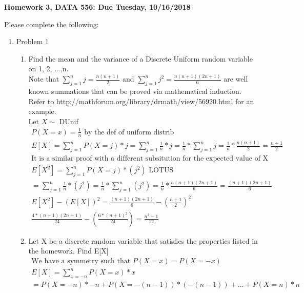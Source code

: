 \documentclass[11pt]{article}
\begin{document}
\begin{title}
	{\Large\bf Homework 3, DATA 556: Due Tuesday, 10/16/2018}
\end{title}

\author{\bf Alexander Van Roijen}

\maketitle

\newpage
Please complete the following:
\begin{enumerate}
\item Problem 1
\begin{enumerate}
	\item Find the mean and the variance of a Discrete Uniform random variable on 1, 2, ...,n.\\
	Note that $\sum_{j=1}^{n} j = \frac{n(n+1)}{2}$ and  $\sum_{j=1}^{n} j^2 = \frac{n(n+1)(2n+1)}{6}$ are well known summations that can be proved via mathematical induction. \\ Refer to
	http://mathforum.org/library/drmath/view/56920.html
	for an example.\\
	 Let $X \sim $ DUnif
	\begin{gather}
	P(X = x) = \frac{1}{n} \text{ by the def of uniform distrib}\\
	E[X] = \sum_{j=1}^{n} P(X=j)*j = \sum_{j=1}^{n} \frac{1}{n}*j = \frac{1}{n} *\sum_{j=1}^{n} j = \frac{1}{n} * \frac{n(n+1)}{2} = \frac{n+1}{2}\\
	\text{It is a similar proof with a different subsitution for the expected value of X squared} \\
	E[X^2] = \sum_{j=1}^{n} P(X=j)*(j^2) \text{ LOTUS} \\
	= \sum_{j=1}^{n} \frac{1}{n}*(j^2) = \frac{1}{n} *\sum_{j=1}^{n} (j^2) = \frac{1}{n} * \frac{n(n+1)(2n+1)}{6} = \frac{(n+1)(2n+1)}{6}\\
	E[X^2]-(E[X])^2 = \frac{(n+1)(2n+1)}{6} - (\frac{n+1}{2})^2\\
	\frac{4*(n+1)(2n+1)}{24} - (\frac{6*(n+1)^2}{24}) = \frac{n^2-1}{12}
	\end{gather}
	\item Let X be a discrete random variable that satisfies the properties listed in the homework. Find E[X]
	\begin{gather}
		\text{We have a symmetry such that } P(X=x)=P(X=-x)\\
		E[X]= \sum_{x=-n}^{n} P(X=x)*x\\
		= P(X=-n)*-n + P(X=-(n-1))*(-(n-1)) + ... + P(X=n)*n \\

\end{gather}
\end{enumerate}
\end{enumerate}
\end{document}
